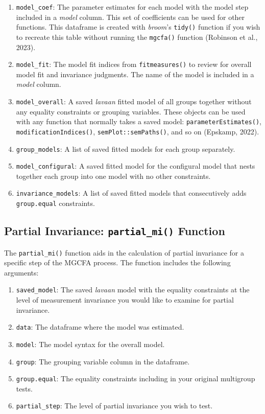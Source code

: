 \documentclass[
  man]{apa7}
\providecommand{\tightlist}{%
  \setlength{\itemsep}{0pt}\setlength{\parskip}{0pt}}
\begin{document}
\begin{enumerate}
\def\labelenumi{\arabic{enumi})}
\tightlist
\item
  \texttt{model\_coef}: The parameter estimates for each model with the model step included in a \emph{model} column. This set of coefficients can be used for other functions. This dataframe is created with \emph{broom}'s \texttt{tidy()} function if you wish to recreate this table without running the \texttt{mgcfa()} function (Robinson et al., 2023).
\item
  \texttt{model\_fit}: The model fit indices from \texttt{fitmeasures()} to review for overall model fit and invariance judgments. The name of the model is included in a \emph{model} column.
\item
  \texttt{model\_overall}: A saved \emph{lavaan} fitted model of all groups together without any equality constraints or grouping variables. These objects can be used with any function that normally takes a saved model: \texttt{parameterEstimates()}, \texttt{modificationIndices()}, \texttt{semPlot::semPaths()}, and so on (Epskamp, 2022).
\item
  \texttt{group\_models}: A list of saved fitted models for each group separately.
\item
  \texttt{model\_configural}: A saved fitted model for the configural model that nests together each group into one model with no other constraints.
\item
  \texttt{invariance\_models}: A list of saved fitted models that consecutively adds \texttt{group.equal} constraints.
\end{enumerate}

\subsection{\texorpdfstring{Partial Invariance: \texttt{partial\_mi()} Function}{Partial Invariance: partial\_mi() Function}}\label{partial-invariance-partial_mi-function}

The \texttt{partial\_mi()} function aids in the calculation of partial invariance for a specific step of the MGCFA process. The function includes the following arguments:

\begin{enumerate}
\def\labelenumi{\arabic{enumi})}
\tightlist
\item
  \texttt{saved\_model}: The saved \emph{lavaan} model with the equality constraints at the level of measurement invariance you would like to examine for partial invariance.
\item
  \texttt{data}: The dataframe where the model was estimated.
\item
  \texttt{model}: The model syntax for the overall model.
\item
  \texttt{group}: The grouping variable column in the dataframe.
\item
  \texttt{group.equal}: The equality constraints including in your original multigroup tests.
\item
  \texttt{partial\_step}: The level of partial invariance you wish to test.
\end{enumerate}
\end{document}
